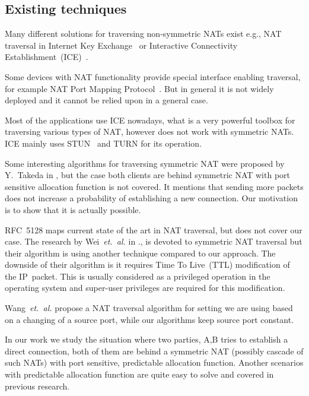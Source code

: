 \documentclass[twoside]{article}
\newcommand{\ignore}[1]{}
\begin{document}
\begin{multicols}{2}
\section{Existing techniques}
Many different solutions for traversing non-symmetric NATs exist e.g., NAT traversal in Internet Key Exchange~\citep{rfc3947} or 
Interactive Connectivity Establishment~(ICE)~\citep{rfc5245}. %

Some devices with NAT functionality provide special interface enabling traversal, for example NAT Port Mapping Protocol~\citep{rfc6886}. But in general 
it is not widely deployed and it cannot be relied upon in a general case. 

Most of the applications use ICE\ignore{~\citep{rfc5245}} nowadays, what is a very powerful toolbox for traversing 
various types of NAT, however does not work with symmetric NATs. ICE mainly uses STUN~\citep{rfc5389} and TURN\ignore{~\citep{rfc5766}} for its operation.

Some interesting algorithms for traversing symmetric NAT were proposed by Y.~Takeda in \citep{takeda}, but the case both clients are behind symmetric NAT
with port sensitive allocation function is not covered. It mentions that sending more packets does not increase a probability of establishing a new connection.
Our motivation is to show that it is actually possible.

RFC~5128 \citep{rfc5128} maps current state of the art in NAT traversal, but does not cover our case. 
The research by Wei~\emph{et.~al.} in \citep{wei}., is devoted to symmetric NAT traversal but their algorithm is using another technique compared
to our approach. The downside of their algorithm is it requires Time To Live~(TTL) modification of the IP~packet. This is usually considered
as a privileged operation in the operating system and super-user privileges are required for this modification. 

Wang~\emph{et.~al.} \citep{Wang:2006:RSN:1156422.1156550} propose a NAT traversal algorithm for setting we are using based on
a changing of a source port, while our algorithms keep source port constant.

In our work we study the situation where two parties, A,B tries to establish a direct connection, both of them are behind 
a symmetric NAT (possibly cascade of such NATs) with port sensitive, predictable allocation function. Another scenarios with
predictable allocation function are quite easy to solve and covered in previous research. 


\end{multicols}
\end{document}
